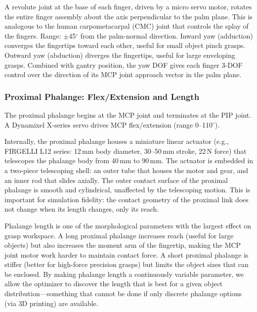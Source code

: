 \documentclass[journal]{IEEEtran}
\begin{document}
A revolute joint at the base of each finger, driven by a micro servo motor, rotates
the entire finger assembly about the axis perpendicular to the palm plane.
This is analogous to the human carpometacarpal (CMC) joint that controls the splay of
the fingers.
Range: $\pm$45$^\circ$ from the palm-normal direction.
Inward yaw (adduction) converges the fingertips toward each other, useful for small
object pinch grasps.
Outward yaw (abduction) diverges the fingertips, useful for large enveloping grasps.
Combined with gantry position, the yaw DOF gives each finger 3-DOF control over the
direction of its MCP joint approach vector in the palm plane.

\subsubsection{Proximal Phalange: Flex/Extension and Length}

The proximal phalange begins at the MCP joint and terminates at the PIP joint.
A Dynamixel X-series servo drives MCP flex/extension (range 0--110$^\circ$).

Internally, the proximal phalange houses a miniature linear actuator
(e.g., FIRGELLI L12 series: 12\,mm body diameter, 30--50\,mm stroke, 22\,N force)
that telescopes the phalange body from 40\,mm to 90\,mm.
The actuator is embedded in a two-piece telescoping shell: an outer tube that houses
the motor and gear, and an inner rod that slides axially.
The outer contact surface of the proximal phalange is smooth and cylindrical,
unaffected by the telescoping motion.
This is important for simulation fidelity: the contact geometry of the proximal link
does not change when its length changes, only its reach.

\begin{notebox}
Phalange length is one of the morphological parameters with the largest effect on grasp
workspace.
A long proximal phalange increases reach (useful for large objects) but also increases
the moment arm of the fingertip, making the MCP joint motor work harder to maintain
contact force.
A short proximal phalange is stiffer (better for high-force precision grasps) but
limits the object sizes that can be enclosed.
By making phalange length a continuously variable parameter, we allow the optimizer to
discover the length that is best for a given object distribution---something that cannot
be done if only discrete phalange options (via 3D printing) are available.
\end{notebox}
\end{document}

